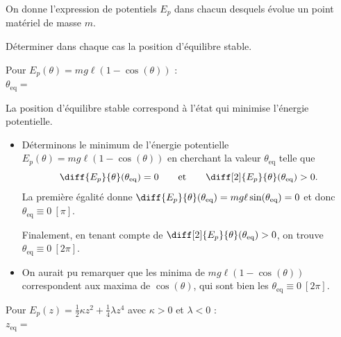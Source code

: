 On donne l'expression de potentiels $E_p$ dans chacun desquels évolue un point matériel de masse $m$. 
\medskip

Déterminer dans chaque cas la position d'équilibre stable.
\smallskip

\debutEntrainement




\begin{enonce}
Pour $E_p(\theta)=mg\ell(1-\cos(\theta))$ : \minusMedskip \\
$\theta_{\textrm{eq}} = $
\end{enonce}


\begin{corrige}
La position d'équilibre stable correspond à l'état qui minimise l'énergie potentielle.

\begin{itemize}
\item
Déterminons le minimum de l'énergie potentielle $E_p(\theta)=mg\ell(1-\cos(\theta))$ en cherchant la valeur $\theta_\text{eq}$ telle que 
\[
\diff{E_p}{\theta}(\theta_\text{eq})=0
\qquad\text{et}\qquad
\diff[2]{E_p}{\theta}(\theta_\text{eq})>0.
\]
La première égalité donne $
\diff{E_p}{\theta}(\theta_\text{eq})=
mg\ell\sin(\theta_\text{eq})=0$ et donc $\theta_\text{eq} \equiv 0\ [\pi]$.

Finalement, en tenant compte de $\diff[2]{E_p}{\theta}(\theta_\text{eq})>0$, on trouve $\theta_\text{eq} \equiv 0\ [2\pi]$.

\item On aurait pu remarquer que les minima de $mg\ell(1-\cos(\theta))$ correspondent aux maxima de $\cos(\theta)$, qui sont bien les $\theta_\text{eq}\equiv0\ [2\pi]$.
\end{itemize}
\end{corrige}






\begin{enonce}
Pour $E_p(z)=\frac{1}{2}\kappa z^2+\frac{1}{4}\lambda z^4$ \quad avec $\kappa>0$ et $\lambda<0$ : \minusBigskip\\
$z_{\textrm{eq}} = $
\end{enonce}

